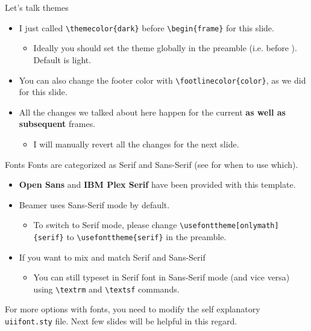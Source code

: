 \begin{frame}[fragile]{Let's talk themes}
\begin{itemize}
\item I just called \verb|\themecolor{dark}| before \verb|\begin{frame}| for this slide.
\begin{itemize}
    \item Ideally you should set the theme globally in the preamble (i.e. before \verb||). Default is light.
\end{itemize}
\item You can also change the footer color with \verb|\footlinecolor{color}|, as we did for this slide.
\item All the changes we talked about here happen for the current \textbf{as well as subsequent} frames.
\begin{itemize}
    \item I will manually revert all the changes for the next slide.
\end{itemize}
\end{itemize}
\end{frame}




\begin{frame}[fragile]{Fonts}
Fonts are categorized as \textrm{Serif} and \textsf{Sans-Serif} (see  for when to use which).

\begin{itemize}
    \item \textbf{\textsf{Open Sans}} and \textbf{\textrm{IBM Plex Serif}} have been provided with this template.
    \item Beamer uses \textsf{Sans-Serif} mode by default.
    \begin{itemize}
        \item To switch to Serif mode, please change \verb|\usefonttheme[onlymath]{serif}| to \verb|\usefonttheme{serif}| in the preamble.
    \end{itemize}
    \item If you want to mix and match Serif and Sans-Serif
    \begin{itemize}
        \item You can still typeset in Serif font in Sans-Serif mode (and vice versa) using \verb|\textrm| and \verb|\textsf| commands.
    \end{itemize}
\end{itemize}
For more options with fonts, you need to modify the self explanatory \verb|uiifont.sty| file. Next few slides will be helpful in this regard.
\end{frame}


